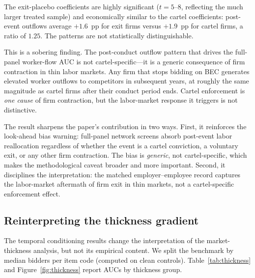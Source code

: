 The exit-placebo coefficients are highly significant ($t = 5$--$8$, reflecting the much larger treated sample) and economically similar to the cartel coefficients: post-event outflows average $+1.6$~pp for exit firms versus $+1.9$~pp for cartel firms, a ratio of $1.25$. The patterns are not statistically distinguishable.

This is a sobering finding. The post-conduct outflow pattern that drives the full-panel worker-flow AUC is not cartel-specific---it is a generic consequence of firm contraction in thin labor markets. Any firm that stops bidding on BEC generates elevated worker outflows to competitors in subsequent years, at roughly the same magnitude as cartel firms after their conduct period ends. Cartel enforcement is \emph{one cause} of firm contraction, but the labor-market response it triggers is not distinctive.

The result sharpens the paper's contribution in two ways. First, it reinforces the look-ahead bias warning: full-panel network screens absorb post-event labor reallocation regardless of whether the event is a cartel conviction, a voluntary exit, or any other firm contraction. The bias is \emph{generic}, not cartel-specific, which makes the methodological caveat broader and more important. Second, it disciplines the interpretation: the matched employer--employee record captures the labor-market aftermath of firm exit in thin markets, not a cartel-specific enforcement effect.

\subsection{Reinterpreting the thickness gradient}\label{sec:heterogeneity}

The temporal conditioning results change the interpretation of the market-thickness analysis, but not its empirical content. We split the benchmark by median bidders per item code (computed on clean controls). Table~\ref{tab:thickness} and Figure~\ref{fig:thickness} report AUCs by thickness group.


